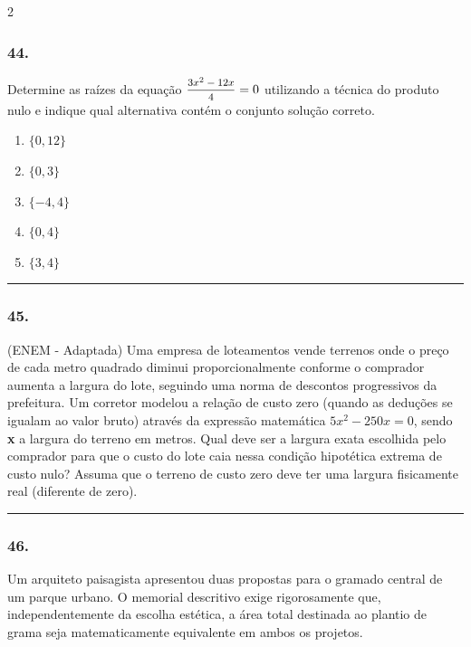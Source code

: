 \documentclass[twoside, 10pt, a4paper]{article}
\newlength{\espacoPreQuestao}\setlength{\espacoPreQuestao}{0.1cm}
\newlength{\espacoQuestao}\setlength{\espacoQuestao}{0.2cm}
\begin{document}
\begin{multicols*}{2}
\subsubsection*{44.} Determine as raízes da equação $ \mfrac{3x^2 - 12x}{4} = 0 $ utilizando a técnica do produto nulo e indique qual alternativa contém o conjunto solução correto.
\begin{enumerate}[label=\alph*)]
    \item $ \{0, 12\} $
    \item $ \{0, 3\} $
    \item $ \{-4, 4\} $
    \item $ \{0, 4\} $
    \item $ \{3, 4\} $
\end{enumerate}
\par\vspace{\espacoQuestao}

\noindent\textcolor{CorLinha}{\rule{\linewidth}{0.5pt}} 
\par\vspace{\espacoPreQuestao}
\subsubsection*{45.} (ENEM - Adaptada) Uma empresa de loteamentos vende terrenos onde o preço de cada metro quadrado diminui proporcionalmente conforme o comprador aumenta a largura do lote, seguindo uma norma de descontos progressivos da prefeitura. Um corretor modelou a relação de custo zero (quando as deduções se igualam ao valor bruto) através da expressão matemática $ 5x^2 - 250x = 0 $, sendo \textbf{x} a largura do terreno em metros. Qual deve ser a largura exata escolhida pelo comprador para que o custo do lote caia nessa condição hipotética extrema de custo nulo? Assuma que o terreno de custo zero deve ter uma largura fisicamente real (diferente de zero).
\par\vspace{\espacoQuestao}
\noindent\textcolor{CorLinha}{\rule{\linewidth}{0.5pt}} 
\par\vspace{\espacoPreQuestao}
\subsubsection*{46.} Um arquiteto paisagista apresentou duas propostas para o gramado central de um parque urbano. O memorial descritivo exige rigorosamente que, independentemente da escolha estética, a área total destinada ao plantio de grama seja matematicamente equivalente em ambos os projetos.


\end{multicols*}
\end{document}
